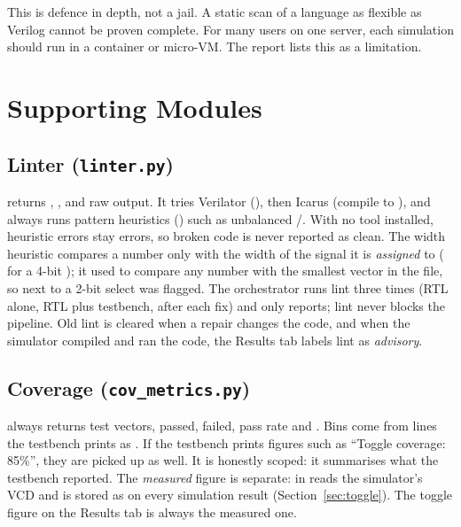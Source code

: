 \begin{warnbox}
This is defence in depth, not a jail. A static scan of a language as flexible as Verilog cannot be proven complete. For many users on one server, each simulation should run in a container or micro-VM. The report lists this as a limitation.
\end{warnbox}

\chapter{Supporting Modules}
\label{ch:support}

\section{Linter (\texttt{linter.py})}

 returns , ,  and raw output. It tries Verilator (), then Icarus (compile to ), and always runs pattern heuristics () such as unbalanced /. With no tool installed, heuristic errors stay errors, so broken code is never reported as clean. The width heuristic compares a number only with the width of the signal it is \emph{assigned} to ( for a 4-bit ); it used to compare any number with the smallest vector in the file, so  next to a 2-bit select was flagged. The orchestrator runs lint three times (RTL alone, RTL plus testbench, after each fix) and only reports; lint never blocks the pipeline. Old lint is cleared when a repair changes the code, and when the simulator compiled and ran the code, the Results tab labels lint as \emph{advisory}.

\section{Coverage (\texttt{cov\_metrics.py})}
\label{sec:coverage}

 always returns test vectors, passed, failed, pass rate and . Bins come from lines the testbench prints as . If the testbench prints figures such as ``Toggle coverage: 85\%'', they are picked up as well. It is honestly scoped: it summarises what the testbench reported. The \emph{measured} figure is separate:  in  reads the simulator's VCD and is stored as  on every simulation result (Section~\ref{sec:toggle}). The toggle figure on the Results tab is always the measured one.

